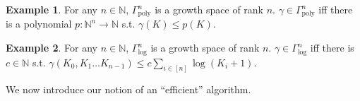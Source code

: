 \documentclass{article}
\numberwithin{equation}{section}
\theoremstyle{definition}
\newtheorem{example}{Example}[section]
\theoremstyle{plain}
\newcommand{\Nats}{\mathbb{N}}
\begin{document}
\begin{example}

For any $n \in \Nats$, $\Gamma_{\text{poly}}^n$ is a growth space of rank $n$. $\gamma \in \Gamma_{\text{poly}}^n$ iff there is a polynomial $p: \Nats^n \rightarrow \Nats$ s.t. $\gamma(K) \leq p(K)$.

\end{example}

\begin{example}

For any $n \in \Nats$, $\Gamma_{\text{log}}^n$ is a growth space of rank $n$. $\gamma \in \Gamma_{\text{log}}^n$ iff there is $c \in \Nats$ s.t. $\gamma(K_0, K_1 \ldots K_{n-1}) \leq c \sum_{i \in [n]} \log(K_i+1)$.

\end{example}

We now introduce our notion of an \enquote{efficient} algorithm.
\end{document}
